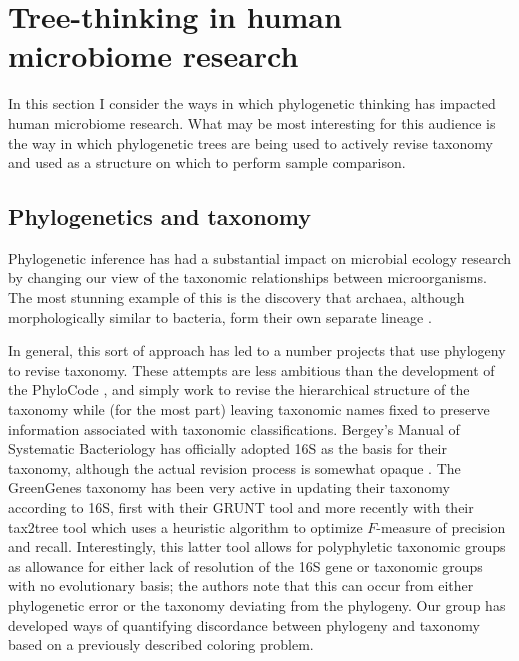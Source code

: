 \documentclass{amsart}
\begin{document}
\section{Tree-thinking in human microbiome research}

In this section I consider the ways in which phylogenetic thinking has impacted human microbiome research.
What may be most interesting for this audience is the way in which phylogenetic trees are being used to actively revise taxonomy and used as a structure on which to perform sample comparison.

\subsection{Phylogenetics and taxonomy}

Phylogenetic inference has had a substantial impact on microbial ecology research by changing our view of the taxonomic relationships between microorganisms.
The most stunning example of this is the discovery that archaea, although morphologically similar to bacteria, form their own separate lineage \citep{woese1977phylogenetic}.

In general, this sort of approach has led to a number projects that use phylogeny to revise taxonomy.
These attempts are less ambitious than the development of the PhyloCode \citep{forey2001phylocode}, and simply work to revise the hierarchical structure of the taxonomy while (for the most part) leaving taxonomic names fixed to preserve information associated with taxonomic classifications.
Bergey's Manual of Systematic Bacteriology has officially adopted 16S as the basis for their taxonomy, although the actual revision process is somewhat opaque \citep{kreig1984bergey}.
The GreenGenes taxonomy \citep{desantis2006greengenes} has been very active in updating their taxonomy according to 16S, first with their GRUNT tool \citep{dalevi2007automated} and more recently with their tax2tree tool \citep{mcdonald2011improved} which uses a heuristic algorithm to optimize $F$-measure of precision and recall.
Interestingly, this latter tool allows for polyphyletic taxonomic groups as allowance for either lack of resolution of the 16S gene or taxonomic groups with no evolutionary basis; the authors note that this can occur from either phylogenetic error or the taxonomy deviating from the phylogeny.
Our group \citep{matsen2012reconciling} has developed ways of quantifying discordance between phylogeny and taxonomy based on a previously described coloring problem.
\end{document}
